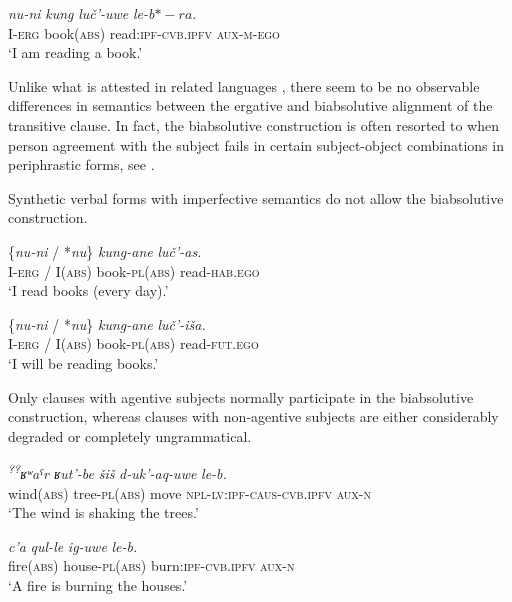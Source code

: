 ﻿\documentclass[output=paper]{langsci/langscibook}
\begin{document}
\ex %
\gll \emph{nu-ni} \emph{kung} \emph{luč'-uwe} \emph{le-b\(*-ra\)}.\\
I-\textsc{erg} book(\textsc{abs}) read:\textsc{ipf}-\textsc{cvb.ipfv} \textsc{aux}-\textsc{m}-\textsc{ego}\\
\glt `I am reading a book.'
\z
\z

Unlike what is attested in related languages \citep{forker2012}, there seem
to be no observable differences in semantics between the ergative and
biabsolutive alignment of the transitive clause. In fact, the
biabsolutive construction is often resorted to when person
agreement with the subject fails in certain subject-object combinations
in periphrastic forms, see .

Synthetic verbal forms with imperfective semantics do not allow the
biabsolutive construction.

\ea %
\gll \{\emph{nu-ni} / *\emph{nu}\} \emph{kung-ane} \emph{luč'-as.}\\
I-\textsc{erg} / I(\textsc{abs}) book-\textsc{pl}(\textsc{abs}) read-\textsc{hab}.\textsc{ego}\\
\glt `I read books (every day).'

\ex %
\gll \{\emph{nu-ni} / *\emph{nu}\} \emph{kung-ane} \emph{luč'-iša.}\\
I-\textsc{erg} / I(\textsc{abs}) book-\textsc{pl}(\textsc{abs}) read-\textsc{fut}.\textsc{ego}\\
\glt `I will be reading books.'
\z

Only clauses with agentive subjects normally participate in the
biabsolutive construction, whereas clauses with non-agentive subjects
are either considerably degraded or completely ungrammatical.

\ea %
\gll \emph{\textsuperscript{??}ʁʷaˤr} \emph{ʁut'-be} \emph{šiš} \emph{d-uk'-aq-uwe} \emph{le-b.}\\
wind(\textsc{abs}) tree-\textsc{pl}(\textsc{abs}) move \textsc{npl}-\textsc{lv}:\textsc{ipf}-\textsc{caus}-\textsc{cvb.ipfv} \textsc{aux}-\textsc{n}\\
\glt `The wind is shaking the trees.'

\ex %
\gll *\emph{c'a} \emph{qul-le} \emph{ig-uwe} \emph{le-b.}\\
fire(\textsc{abs}) house-\textsc{pl}(\textsc{abs}) burn:\textsc{ipf}-\textsc{cvb.ipfv} \textsc{aux}-\textsc{n}\\
\glt `A fire is burning the houses.'
\end{document}
